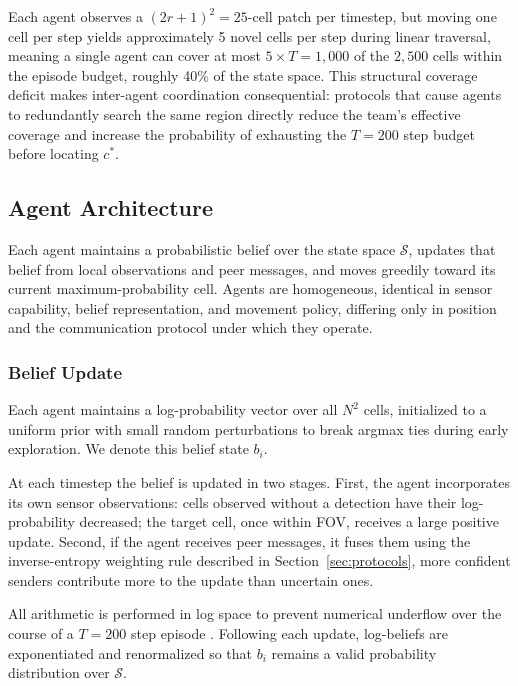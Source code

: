 \documentclass[pdflatex,sn-mathphys-num]{sn-jnl}%
\theoremstyle{thmstyleone}%
\theoremstyle{thmstyletwo}%
\theoremstyle{thmstylethree}%
\begin{document}
Each agent observes a $(2r+1)^2 = 25$-cell patch per timestep, but moving one cell per step yields approximately 5 novel cells per step during linear traversal, meaning a single agent can cover at most $5 \times T = 1{,}000$ of the $2{,}500$ cells within the episode budget, roughly 40\% of the state space. This structural coverage deficit makes inter-agent coordination consequential: protocols that cause agents to redundantly search the same region directly reduce the team's effective coverage and increase the probability of exhausting the $T = 200$ step budget before locating $c^*$.

\subsection{Agent Architecture}

Each agent maintains a probabilistic belief over the state space 
$\mathcal{S}$, updates that belief from local observations and peer 
messages, and moves greedily toward its current maximum-probability cell. Agents are homogeneous, identical in sensor capability, belief representation, and movement policy, differing only in position and the communication protocol under which they operate.

\subsubsection{Belief Update}

Each agent maintains a log-probability vector over all $N^2$ cells, 
initialized to a uniform prior with small random perturbations to break argmax ties during early exploration. We denote this belief state $b_i$.

At each timestep the belief is updated in two stages. First, the agent incorporates its own sensor observations: cells observed without a detection have their log-probability decreased; the target cell, once within FOV, receives a large positive update. Second, if the agent receives peer messages, it fuses them using the inverse-entropy weighting rule described in  Section~\ref{sec:protocols}, more confident senders contribute more to the update than uncertain ones.

All arithmetic is performed in log space to prevent numerical underflow over the course of a $T = 200$ step episode \cite{thrun2002probabilistic}. Following each update, 
log-beliefs are exponentiated and renormalized so that $b_i$ remains a valid probability distribution over $\mathcal{S}$.
\end{document}
